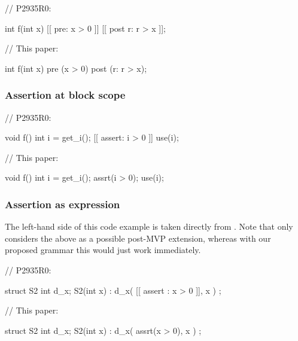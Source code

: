 \begin{minipage}{8cm}
\begin{codeblock}
// P2935R0:

int f(int x) 
  [[ pre: x  > 0 ]]
  [[ post r: r > x ]];
\end{codeblock}
\end{minipage}
\begin{minipage}{8cm}
\begin{codeblock}
// This paper:

int f(int x) 
  pre (x  > 0)
  post (r: r > x);
\end{codeblock}
\end{minipage}

\subsubsection{Assertion at block scope}

\begin{minipage}{8cm}
\begin{codeblock}
// P2935R0:

void f() {
  int i = get_i();
  [[ assert: i  > 0 ]]
  use(i);
}
\end{codeblock}
\end{minipage}
\begin{minipage}{8cm}
\begin{codeblock}
// This paper:

void f() {
  int i = get_i();
  assrt(i  > 0);
  use(i);
}
\end{codeblock}
\end{minipage}

\subsubsection{Assertion as expression}

The left-hand side of this code example is taken directly from \cite{P2935R0}. Note that \cite{P2935R0} only considers the above as a possible post-MVP extension, whereas with our proposed grammar this would just work immediately.
\\

\begin{minipage}{8cm}
\begin{codeblock}
// P2935R0:

struct S2 {
  int d_x;
  S2(int x)
    : d_x( [[ assert : x > 0 ]], x )
  {}
};
\end{codeblock}
\end{minipage}
\begin{minipage}{8cm}
\begin{codeblock}
// This paper:

struct S2 {
  int d_x;
  S2(int x)
    : d_x( assrt(x > 0), x )
  {}
};
\end{codeblock}
\end{minipage}

